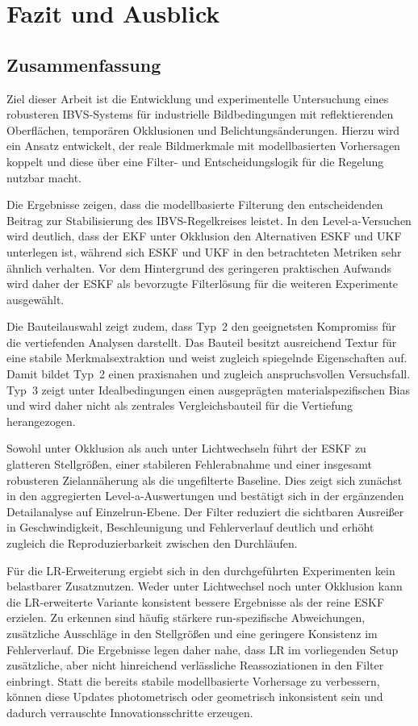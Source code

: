 \chapter{Fazit und Ausblick}
\label{ch:fazit_ausblick}

\section{Zusammenfassung}

Ziel dieser Arbeit ist die Entwicklung und experimentelle Untersuchung eines robusteren \ac{IBVS}-Systems für industrielle Bildbedingungen mit reflektierenden Oberflächen, temporären Okklusionen und Belichtungsänderungen. Hierzu wird ein Ansatz entwickelt, der reale Bildmerkmale mit modellbasierten Vorhersagen koppelt und diese über eine Filter- und Entscheidungslogik für die Regelung nutzbar macht.

Die Ergebnisse zeigen, dass die modellbasierte Filterung den entscheidenden Beitrag zur Stabilisierung des \ac{IBVS}-Regelkreises leistet. In den Level-a-Versuchen wird deutlich, dass der \ac{EKF} unter Okklusion den Alternativen \ac{ESKF} und \ac{UKF} unterlegen ist, während sich \ac{ESKF} und \ac{UKF} in den betrachteten Metriken sehr ähnlich verhalten. Vor dem Hintergrund des geringeren praktischen Aufwands wird daher der \ac{ESKF} als bevorzugte Filterlösung für die weiteren Experimente ausgewählt.

Die Bauteilauswahl zeigt zudem, dass Typ~2 den geeignetsten Kompromiss für die vertiefenden Analysen darstellt. Das Bauteil besitzt ausreichend Textur für eine stabile Merkmalsextraktion und weist zugleich spiegelnde Eigenschaften auf. Damit bildet Typ~2 einen praxisnahen und zugleich anspruchsvollen Versuchsfall. Typ~3 zeigt unter Idealbedingungen einen ausgeprägten materialspezifischen Bias und wird daher nicht als zentrales Vergleichsbauteil für die Vertiefung herangezogen.

Sowohl unter Okklusion als auch unter Lichtwechseln führt der \ac{ESKF} zu glatteren Stellgrößen, einer stabileren Fehlerabnahme und einer insgesamt robusteren Zielannäherung als die ungefilterte Baseline. Dies zeigt sich zunächst in den aggregierten Level-a-Auswertungen und bestätigt sich in der ergänzenden Detailanalyse auf Einzelrun-Ebene. Der Filter reduziert die sichtbaren Ausreißer in Geschwindigkeit, Beschleunigung und Fehlerverlauf deutlich und erhöht zugleich die Reproduzierbarkeit zwischen den Durchläufen.

Für die \acf{LR}-Erweiterung ergiebt sich in den durchgeführten Experimenten kein belastbarer Zusatznutzen. Weder unter Lichtwechsel noch unter Okklusion kann die \ac{LR}-erweiterte Variante konsistent bessere Ergebnisse als der reine \ac{ESKF} erzielen. Zu erkennen sind häufig stärkere run-spezifische Abweichungen, zusätzliche Ausschläge in den Stellgrößen und eine geringere Konsistenz im Fehlerverlauf. Die Ergebnisse legen daher nahe, dass \ac{LR} im vorliegenden Setup zusätzliche, aber nicht hinreichend verlässliche Reassoziationen in den Filter einbringt. Statt die bereits stabile modellbasierte Vorhersage zu verbessern, können diese Updates photometrisch oder geometrisch inkonsistent sein und dadurch verrauschte Innovationsschritte erzeugen.

